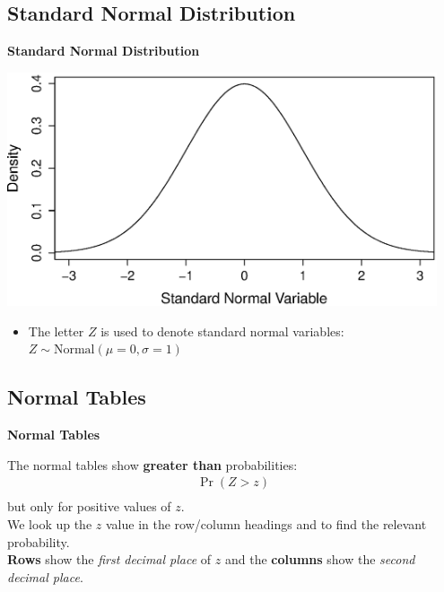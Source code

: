 \documentclass[compress]{beamer}        %
\makeatletter
\newcommand{\tcb}{\textcolor{beamer@blendedblue}}
\makeatother
\begin{document}
\subsection{Standard Normal Distribution}
\begin{frame}{\bf \tcb{Standard Normal Distribution\\[-1.5cm]}}

\begin{center}
\includegraphics[width=0.95\textwidth, trim = 0.0cm 0.5cm 0.3cm 0.5cm, clip]{ZNormal}
\end{center}

\begin{itemize}
\item The letter $Z$ is used to denote standard normal variables: $Z \sim \text{Normal}(\mu=0,\sigma=1)$
\end{itemize}

\end{frame}


\subsection{Normal Tables}
\begin{frame}{\bf \tcb{Normal Tables}}

The normal tables show {\bf greater than} probabilities:\\[-0.1cm]
\begin{align*}
\boxed{\Pr(Z > z)}\\[-0.4cm]
\end{align*}
but only for positive values of $z$.\\[0.8cm]

We look up the $z$ value in the row/column headings and to find the relevant probability.\\[0.8cm]

{\bf Rows} show the \emph{first decimal place} of $z$ and the {\bf columns} show the \emph{second decimal place}.


\end{frame}
\end{document}
